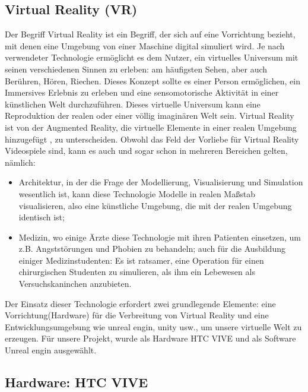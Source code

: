 \subsection{Virtual Reality (VR)} \label{grund-vr}


Der Begriff Virtual Reality ist ein Begriff, der sich auf eine Vorrichtung bezieht, mit denen eine Umgebung von einer Maschine digital simuliert wird. 
Je nach verwendeter Technologie ermöglicht es dem Nutzer, ein virtuelles Universum mit seinen verschiedenen Sinnen zu erleben: 
am häufigsten Sehen, aber auch Berühren, Hören, Riechen. 
Dieses Konzept sollte es einer Person ermöglichen, ein Immersives Erlebnis zu erleben und eine sensomotorische Aktivität in einer künstlichen Welt durchzuführen. 
Dieses virtuelle Universum kann eine Reproduktion der realen oder einer völlig imaginären Welt sein. 
Virtual Reality ist von der Augmented Reality, die virtuelle Elemente in einer realen Umgebung hinzugefügt , zu unterscheiden.
Obwohl das Feld der Vorliebe für Virtual Reality Videospiele sind, kann es auch und sogar schon in mehreren Bereichen gelten, nämlich\cite{kolb18}:


\begin{itemize} \setlength\itemsep{-0.15cm}
  \item Architektur, in der die Frage der Modellierung, Visualisierung und Simulation wesentlich ist, kann diese Technologie Modelle in realen Maßstab visualisieren, also eine künstliche Umgebung, die mit der realen Umgebung identisch ist;
  \item Medizin, wo einige Ärzte diese Technologie mit ihren Patienten einsetzen, um z.B. Angststörungen und Phobien zu behandeln; auch für die Ausbildung einiger Medizinstudenten: Es ist ratsamer, eine Operation für einen chirurgischen Studenten zu simulieren, als ihm ein Lebewesen als Versuchskaninchen anzubieten.
\end{itemize}


Der Einsatz dieser Technologie erfordert zwei grundlegende Elemente: 
eine Vorrichtung(Hardware) für die Verbreitung von Virtual Reality und eine Entwicklungsumgebung wie unreal engin, unity usw., um unsere virtuelle Welt zu erzeugen. 
Für unsere Projekt, wurde als Hardware HTC VIVE und als Software Unreal engin ausgewählt.




\subsection{Hardware: HTC VIVE} \label{vr-hardware}

